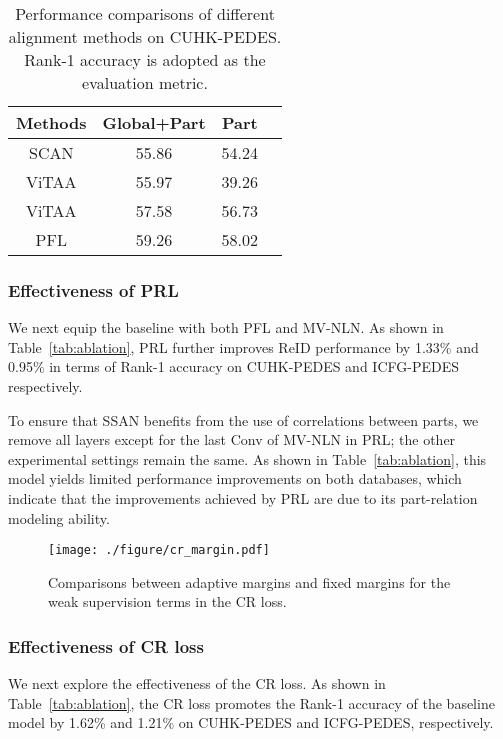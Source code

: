 \documentclass[journal]{IEEEtran}
\begin{document}
\newcommand{\tabincell}[2]{\begin{tabular}{@{}#1@{}}#2\end{tabular}}
\newcommand{\thickhline}{
    \noalign {\ifnum 0=`}\fi \hrule height 1pt
    \futurelet \reserved@a \@xhline}

\begin{table}
\centering
\caption{Performance comparisons of different alignment methods on CUHK-PEDES. Rank-1 accuracy is adopted as the evaluation metric.}
\begin{tabular}{c|ccc}
    \hline
    Methods & Global+Part  & Part \\
    \hline
    \hline
    SCAN \cite{lee2018stacked}  & 55.86 & 54.24 \\
    ViTAA \cite{wang2020vitaa} & 55.97 & 39.26 \\
ViTAA & 57.58 & 56.73 \\
    PFL         & 59.26 & 58.02 \\
    \hline
\end{tabular}
\label{tab:pfl}
\end{table}




\subsubsection{Effectiveness of PRL} We next equip the baseline with both PFL and MV-NLN. As shown in Table~\ref{tab:ablation}, PRL further improves ReID performance by 1.33\% and 0.95\% in terms of Rank-1 accuracy on CUHK-PEDES and ICFG-PEDES respectively.


To ensure that SSAN benefits from the use of correlations between parts, we remove all layers except for the last  Conv of MV-NLN in PRL; the other experimental settings remain the same. As shown in Table~\ref{tab:ablation}, this model yields limited performance improvements on both databases, which indicate that the improvements achieved by PRL are due to its part-relation modeling ability.

\begin{figure}[t]
\begin{center}
\texttt{[image: ./figure/cr\_margin.pdf]}
\end{center}
   \caption{Comparisons between adaptive margins and fixed margins for the weak supervision terms in the CR loss.}
\label{fig:cr_margin}
\end{figure}

\subsubsection{Effectiveness of CR loss} We next explore the effectiveness of the CR loss. As shown in Table~\ref{tab:ablation}, the CR loss promotes the Rank-1 accuracy of the baseline model by 1.62\% and 1.21\% on CUHK-PEDES and ICFG-PEDES, respectively.
\end{document}
